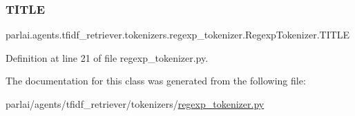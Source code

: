 \subsubsection{\texorpdfstring{T\+I\+T\+LE}{TITLE}}
{\footnotesize\ttfamily parlai.\+agents.\+tfidf\+\_\+retriever.\+tokenizers.\+regexp\+\_\+tokenizer.\+Regexp\+Tokenizer.\+T\+I\+T\+LE\hspace{0.3cm}{\ttfamily [static]}}



Definition at line 21 of file regexp\+\_\+tokenizer.\+py.



The documentation for this class was generated from the following file\+:\begin{DoxyCompactItemize}
\item 
parlai/agents/tfidf\+\_\+retriever/tokenizers/\hyperlink{regexp__tokenizer_8py}{regexp\+\_\+tokenizer.\+py}\end{DoxyCompactItemize}

